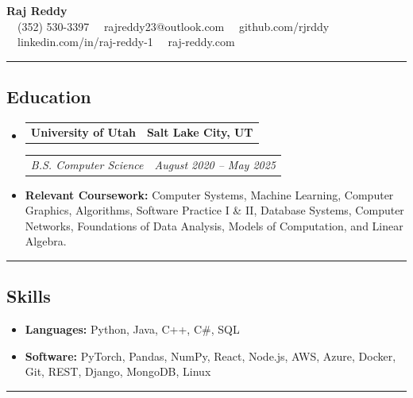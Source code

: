 \documentclass[11pt,letterpaper]{article}
\makeatletter
\newcommand{\headerrow}[2]
{\begin{tabular*}{\linewidth}{l@{\extracolsep{\fill}}r}
#1 &
#2 \\
\end{tabular*}}
\makeatother
\begin{document}
\begin{center}
	{\LARGE \textbf{Raj Reddy}}\\
	\vspace{0.05cm}
	\raisebox{-0.2\height} \ \  (352) 530-3397
    \hfill\raisebox{-0.2\height} \ \ rajreddy23@outlook.com
    \hfill \raisebox{-0.2\height}  \ \ github.com/rjrddy
    \hfill \raisebox{-0.2\height}  \ \ linkedin.com/in/raj-reddy-1
     \hfill \raisebox{-0.2\height}  \ \ raj-reddy.com
\end{center}
\hrule
\vspace{-1em}
\subsection*{\Large Education}
\renewcommand\labelitemi{}
\begin{itemize}[leftmargin=1em]
	\parskip=0.1em
	\item
	      \headerrow
	      {\textbf{University of Utah}}
	      {\textbf{Salt Lake City, UT}}
	      \headerrow
	      {\emph{B.S. Computer Science}}
	      {\emph{August 2020 -- May 2025}}
	      \item \textbf{Relevant Coursework:} Computer Systems, Machine Learning, Computer Graphics, Algorithms, Software Practice I \& II, Database Systems, Computer Networks, Foundations of Data Analysis, Models of Computation, and Linear Algebra.
\end{itemize}
\hrule
\vspace{-1em}
\subsection*{\Large Skills}
\begin{itemize}[leftmargin=1em]
    \parskip=0.1em
	\item \textbf{Languages:}
	      Python, Java, C++, C\#, SQL
	\item \textbf{Software:}
        PyTorch, Pandas, NumPy, React, Node.js, AWS, Azure, Docker, Git, REST, Django, MongoDB, Linux
\end{itemize}
\hrule
\vspace{-1em}
\end{document}
